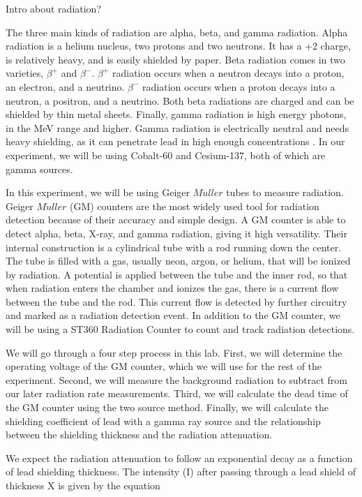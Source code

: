 \par Intro about radiation? 
\par The three main kinds of radiation are alpha, beta, and gamma radiation. Alpha radiation is a helium nucleus, two protons and two neutrons. It has a +2 charge, is relatively heavy, and is easily shielded by paper. Beta radiation comes in two varieties, $\beta^+$ and $\beta^-$. $\beta^+$ radiation occurs when a neutron decays into a proton, an electron, and a neutrino. $\beta^-$ radiation occurs when a proton decays into a neutron, a positron, and a neutrino. Both beta radiations are charged and can be shielded by thin metal sheets. Finally, gamma radiation is high energy photons, in the MeV range and higher. Gamma radiation is electrically neutral and needs heavy shielding, as it can penetrate lead in high enough concentrations \cite{Radiation Source}. In our experiment, we will be using Cobalt-60 and Cesium-137, both of which are gamma sources.
\par In this experiment, we will be using Geiger $M\ddot{u}ller$ tubes to measure radiation. Geiger $M\ddot{u}ller$ (GM) counters are the most widely used tool for radiation detection because of their accuracy and simple design. A GM counter is able to detect alpha, beta, X-ray, and gamma radiation, giving it high versatility. Their internal construction is a cylindrical tube with a rod running down the center. The tube is filled with a gas, usually neon, argon, or helium, that will be ionized by radiation. A potential is applied between the tube and the inner rod, so that when radiation enters the chamber and ionizes the gas, there is a current flow between the tube and the rod. This current flow is detected by further circuitry and marked as a radiation detection event.\cite{Centric} In addition to the GM counter, we will be using a ST360 Radiation Counter to count and track radiation detections. 
\par We will go through a four step process in this lab. First, we will determine the operating voltage of the GM counter, which we will use for the rest of the experiment. Second, we will measure the background radiation to subtract from our later radiation rate measurements. Third, we will calculate the dead time of the GM counter using the two source method. Finally, we will calculate the shielding coefficient of lead with a gamma ray source and the relationship between the shielding thickness and the radiation attenuation. 
\par We expect the radiation attenuation to follow an exponential decay as a function of lead shielding thickness. The intensity (I) after passing through a lead shield of thickness X is given by the equation
